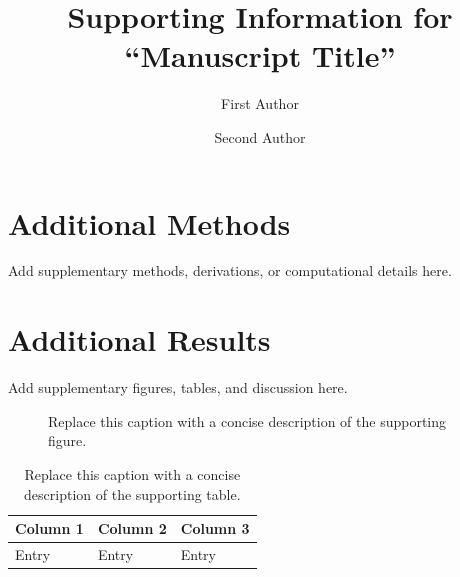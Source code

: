 \documentclass[aps,prl,preprint,preprintnumbers,amsmath,amssymb,superscriptaddress]{revtex4-2}
\begin{document}
\title{Supporting Information for ``Manuscript Title''}

\author{First Author}

\author{Second Author}

\maketitle

\section{Additional Methods}

Add supplementary methods, derivations, or computational details here.

\section{Additional Results}

Add supplementary figures, tables, and discussion here.

\begin{figure}[H]
    \centering
    \caption{Replace this caption with a concise description of the supporting figure.}
    \label{fig:supporting-example}
\end{figure}

\begin{table}[H]
    \centering
    \caption{Replace this caption with a concise description of the supporting table.}
    \label{tab:supporting-example}
    \begin{tabular}{lll}
        \toprule
        Column 1 & Column 2 & Column 3 \\
        \midrule
        Entry & Entry & Entry \\
        \bottomrule
    \end{tabular}
\end{table}
\end{document}
